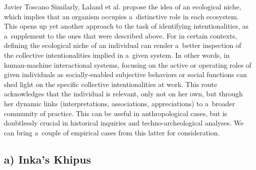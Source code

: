 \begin{artengenv}{Javier Toscano}
Similarly, Laland et al.
\parencite*[][]{laland_niche_2000} %
 propose the idea of an ecological niche, which implies that an organism occupies a~distinctive role in each ecosystem. This opens up yet another approach to the task of identifying intentionalities, as a~supplement to the ones that were described above. For in certain contexts, defining the ecological niche of an individual can render a~better inspection of the collective intentionalities implied in a~given system. In other words, in human-machine interactional systems, focusing on the active or operating roles of given individuals as socially-enabled subjective behaviors or social functions can shed light on the specific collective intentionalities at work. This route acknowledges that the individual is relevant, only not on her own, but through her dynamic links (interpretations, associations, appreciations) to a~broader community of practice. This can be useful in anthropological cases, but is doubtlessly crucial in historical inquiries and techno-archeological analyses. We can bring a~couple of empirical cases from this latter for consideration.

\subsection{a) Inka's Khipus}


\end{artengenv}
